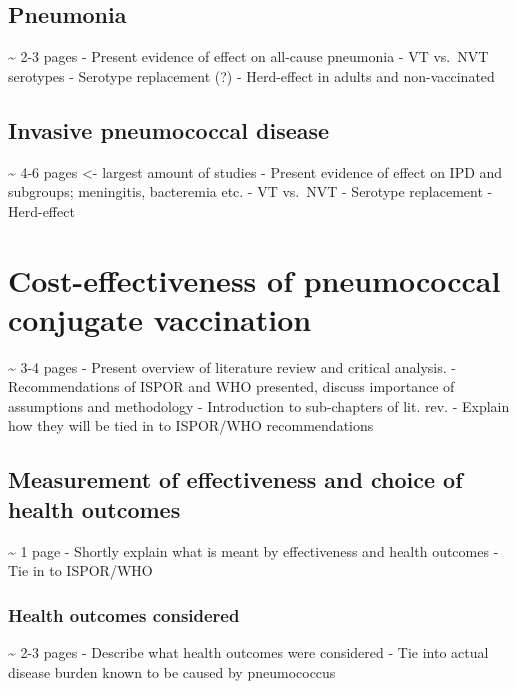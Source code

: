 \documentclass[]{book}
\theoremstyle{definition}
\theoremstyle{definition}
\theoremstyle{definition}
\theoremstyle{remark}
\begin{document}
\subsection{Pneumonia}\label{pneumonia-1}

\textasciitilde{} 2-3 pages - Present evidence of effect on all-cause
pneumonia - VT vs.~NVT serotypes - Serotype replacement (?) -
Herd-effect in adults and non-vaccinated

\subsection{Invasive pneumococcal
disease}\label{invasive-pneumococcal-disease-1}

\textasciitilde{} 4-6 pages \textless{}- largest amount of studies -
Present evidence of effect on IPD and subgroups; meningitis, bacteremia
etc. - VT vs.~NVT - Serotype replacement - Herd-effect

\section{Cost-effectiveness of pneumococcal conjugate
vaccination}\label{cost-effectiveness-of-pneumococcal-conjugate-vaccination}

\textasciitilde{} 3-4 pages - Present overview of literature review and
critical analysis. - Recommendations of ISPOR and WHO presented, discuss
importance of assumptions and methodology - Introduction to sub-chapters
of lit. rev. - Explain how they will be tied in to ISPOR/WHO
recommendations

\subsection{Measurement of effectiveness and choice of health
outcomes}\label{measurement-of-effectiveness-and-choice-of-health-outcomes}

\textasciitilde{} 1 page - Shortly explain what is meant by
effectiveness and health outcomes - Tie in to ISPOR/WHO

\subsubsection{Health outcomes
considered}\label{health-outcomes-considered}

\textasciitilde{} 2-3 pages - Describe what health outcomes were
considered - Tie into actual disease burden known to be caused by
pneumococcus
\end{document}

